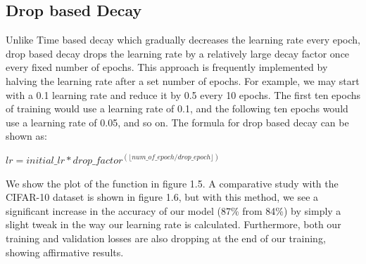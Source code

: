 \subsection{Drop based Decay}
Unlike Time based decay which gradually decreases the learning rate every epoch, drop based decay drops the learning rate by a relatively large decay factor once every fixed number of epochs. 
This approach is frequently implemented by halving the learning rate after a set number of epochs. For example, we may start with a 0.1 learning rate and reduce it by 0.5 every 10 epochs. The first ten epochs of training would use a learning rate of 0.1, and the following ten epochs would use a learning rate of 0.05, and so on. The formula for drop based decay can be shown as:

\begin{center}
    \begin{math}
    lr = initial\_lr*drop\_factor^{(\lfloor                     num\_of\_epoch/drop\_epoch \rfloor)}
    \end{math}
\end{center}
We show the plot of the function in figure 1.5. A comparative study with the CIFAR-10 dataset is shown in figure 1.6, but with this method, we see a significant increase in the accuracy of our model (87\% from 84\%) by simply a slight tweak in the way our learning rate is calculated. Furthermore, both our training and validation losses are also dropping at the end of our training, showing affirmative results.
